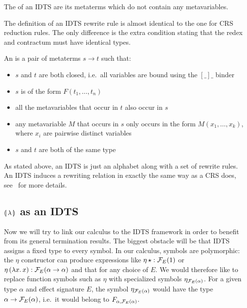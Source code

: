 \begin{definition}
  The  of an IDTS are its metaterms which do not contain any
  metavariables.
\end{definition}

The definition of an IDTS rewrite rule is almost identical to the one for
CRS reduction rules. The only difference is the extra condition stating
that the redex and contractum must have identical types.

\begin{definition}
  An  is a pair of metaterms $s \to t$ such that:
  \begin{itemize}
  \item $s$ and $t$ are both closed, i.e.\ all variables are bound using
    the $[\_]\_$ binder
  \item $s$ is of the form $F(t_1,\ldots,t_n)$
  \item all the metavariables that occur in $t$ also occur in $s$
  \item any metavariable $M$ that occurs in $s$ only occurs in the form
    $M(x_1,\ldots,x_k)$, where $x_i$ are pairwise distinct variables
  \item $s$ and $t$ are both of the same type
  \end{itemize}
\end{definition}

As stated above, an IDTS is just an alphabet along with a set of rewrite
rules. An IDTS induces a rewriting relation in exactly the same way as a
CRS does, see~\cite{blanqui2000termination} for more details.


\subsection{$\llparenthesis \, \lambda \, \rrparenthesis$ as an IDTS}
\label{ssec:banana-idts}

Now we will try to link our calculus to the IDTS framework in order to
benefit from its general termination results. The biggest obstacle will be
that IDTS assigns a fixed type to every symbol. In our calculus, symbols
are polymorphic: the $\eta$ constructor can produce expressions like
$\eta\,\star : \mathcal{F}_E(1)$ or $\eta\,(\lambda x.\, x) : \mathcal{F}_E(\alpha \to
\alpha)$ and that for any choice of $E$. We would therefore like to replace
function symbols such as $\eta$ with specialized symbols
$\eta_{\mathcal{F}_E(\alpha)}$. For a given type $\alpha$ and effect signature $E$,
the symbol $\eta_{\mathcal{F}_E(\alpha)}$ would have the type $\alpha \to
\mathcal{F}_E(\alpha)$, i.e.\ it would belong to $F_{\alpha,\mathcal{F}_E(\alpha)}$.

